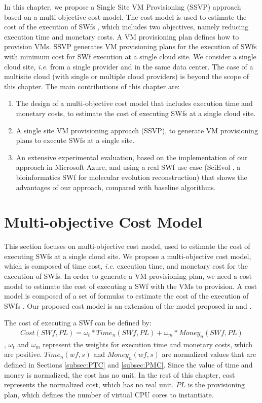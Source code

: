 In this chapter, we propose a Single Site VM Provisioning (SSVP) approach based on a multi-objective cost model.
The cost model is used to estimate the cost of the execution of SWfs \cite{Oliveira2012}, which includes two objectives, namely reducing execution time and monetary costs.
A VM provisioning plan defines how to provision VMs. 
SSVP generates VM provisioning plans for the execution of SWfs with minimum cost for SWf execution at a single cloud site.
We consider a single cloud site, \textit{i.e.} from a single provider and in the same data center. The case of a multisite cloud (with single or multiple cloud providers) is beyond the scope of this chapter.
The main contributions of this chapter are:
\begin{enumerate}
\item The design of a multi-objective cost model that includes execution time and monetary costs, to estimate the cost of executing SWfs at a single cloud site.
\item A single site VM provisioning approach (SSVP), to generate VM provisioning plans to execute SWfs at a single site.
\item An extensive experimental evaluation, based on the implementation of our approach in Microsoft Azure, and using a real SWf use case (SciEvol \cite{Ocana2012}, a bioinformatics SWf for molecular evolution reconstruction) that shows the advantages of our approach, compared with baseline algorithms.
\end{enumerate}

\section{Multi-objective Cost Model}
\label{sec:PMoO}
This section focuses on multi-objective cost model, used to estimate the cost of executing SWfs at a single cloud site. 
We propose a multi-objective cost model, which is composed of time cost, \textit{i.e.} execution time, and monetary cost for the execution of SWfs. In order to generate a VM provisioning plan, we need a cost model to estimate the cost of executing a SWf with the VMs to provision. A cost model is composed of a set of formulas to estimate the cost of the execution of SWfs \cite{Oliveira2012}. Our proposed cost model is an extension of the model proposed in \cite{Oliveira2012} and \cite{Sardina2010}. 

The cost of executing a SWf can be defined by:
\begin{equation}\label{eq:peq0}
\begin{split}
Cost ( SWf, PL ) = \omega_t * Time_n( SWf, PL ) + \omega_m * Money_n( SWf, PL )
\end{split}
\end{equation}
, $\omega_t$ and $\omega_m$ represent the weights for execution time and monetary costs, which are positive. 
$Time_n( wf, s )$ and $Money_n( wf, s )$ are normalized values that are defined in Sections \ref{subsec:PTC} and \ref{subsec:PMC}. Since the value of time and money is normalized, the cost has no unit. In the rest of this chapter, cost represents the normalized cost, which has no real unit. $PL$ is the provisioning plan, which defines the number of virtual CPU cores to instantiate.

